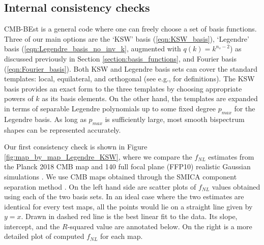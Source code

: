 \subsection{Internal consistency checks} \label{section:internal_consistency}

CMB-BEst is a general code where one can freely choose a set of basis functions. Three of our main options are the `KSW' basis (\ref{eqn:KSW_basis}), `Legendre' basis (\ref{eqn:Legendre_basis_no_inv_k}, augmented with $q(k)=k^{n_s-2}$) as discussed previously in Section \ref{section:basis_functions}, and Fourier basis (\ref{eqn:Fourier_basis}). Both KSW and Legendre basis sets can cover the standard templates: local, equilateral, and orthogonal (see e.g., \cite{PlanckCollaboration2013} for definitions). The KSW basis provides an exact form to the three templates by choosing appropriate powers of $k$ as its basis elements. On the other hand, the templates are expanded in terms of separable Legendre polynomials up to some fixed degree $p_{max}$ for the Legendre basis. As long as $p_{max}$ is sufficiently large, most smooth bispectrum shapes can be represented accurately. 

Our first consistency check is shown in Figure \ref{fig:map_by_map_Legendre_KSW}, where we compare the $f_{NL}$ estimates from the Planck 2018 CMB map and 140 full focal plane (FFP10) realistic Gaussian simulations \cite{PlanckCollaboration2015simulations}. We use CMB maps obtained through the SMICA component separation method \cite{Cardoso2008component, PlanckCollaboration2013ComponentSeparation}. On the left hand side are scatter plots of $f_{NL}$ values obtained using each of the two basis sets. In an ideal case where the two estimates are identical for every test maps, all the points would lie on a straight line given by $y=x$. Drawn in dashed red line is the best linear fit to the data. Its slope, intercept, and the $R$-squared value are annotated below. On the right is a more detailed plot of computed $f_{NL}$ for each map.

